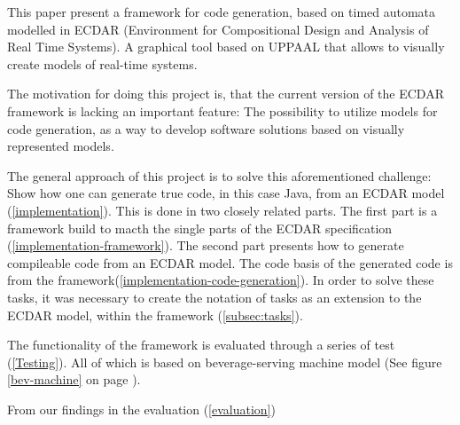 This paper present a framework for code generation, based on timed automata modelled in ECDAR (Environment for Compositional Design and Analysis of Real Time Systems). A graphical tool based on UPPAAL that allows to visually create models of real-time systems.

The motivation for doing this project is, that the current version of the ECDAR framework is lacking an important feature: The possibility to utilize models for code generation, as a way to develop software solutions based on visually represented models.

The general approach of this project is to solve this aforementioned challenge: Show how one can generate true code, in this case Java, from an ECDAR model (\ref{implementation}). This is done in two closely related parts. The first part is a framework build to macth the single parts of the ECDAR specification (\ref{implementation-framework}). The second part presents how to generate compileable code from an ECDAR model. The code basis of the generated code is from the framework(\ref{implementation-code-generation}). In order to solve these tasks, it was necessary to create the notation of tasks as an extension to the ECDAR model, within the framework (\ref{subsec:tasks}). 

The functionality of the framework is evaluated through a series of test (\ref{Testing}). All of which is based on beverage-serving machine model (See figure \ref{bev-machine} on page \pageref{bev-machine}).

From our findings in the evaluation (\ref{evaluation}) 
